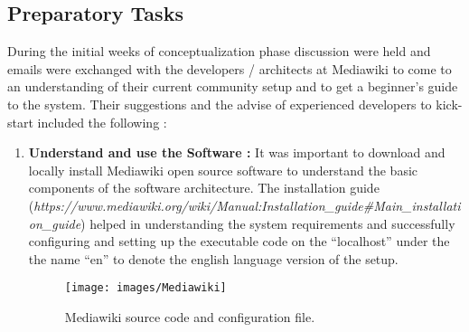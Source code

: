 \subsection{Preparatory Tasks}
\indent During the initial weeks of conceptualization phase discussion were held and emails were exchanged with the developers / architects at Mediawiki to come to an understanding of their current community setup and to get a beginner's guide to the system. Their suggestions and the advise of experienced developers to kick-start included the following :
\begin{enumerate}
\item \textbf{Understand and use the Software : } It was important to download and locally install Mediawiki open source software to understand the basic components of the software architecture. The installation guide (\emph{https://www.mediawiki.org/wiki/Manual:Installation\_guide\#Main\_installation\_guide}) helped in understanding the system requirements and successfully configuring and setting up the executable code on the \enquote{localhost} under the the name \enquote{en} to denote the english language version of the setup. 

\begin{figure}[H]
  \centering
  \texttt{[image: images/Mediawiki]}
  \caption[Mediawiki source code and configuration file]{Mediawiki source code and configuration file.}\label{fig:Mediawiki}
\end{figure}


\end{enumerate}
